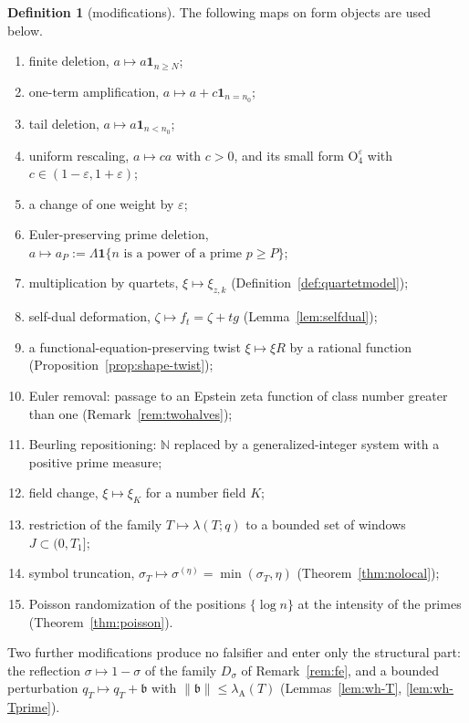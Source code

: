 \documentclass[11pt]{amsart}
\theoremstyle{definition}
\newtheorem{definition}[theorem]{Definition}
\theoremstyle{remark}
\newcommand{\N}{\mathbb N}
\newcommand{\lamA}{\lambda_{\mathrm A}(T)}
\newcommand{\sT}{\sigma_T}
\begin{document}
\begin{definition}[modifications]\label{def:shape-ops}
The following maps on form objects are used below.
\begin{enumerate}
\item[$\mathrm O_1$] finite deletion, $a\mapsto a\mathbf 1_{n\ge N}$;
\item[$\mathrm O_2$] one-term amplification, $a\mapsto a+c\mathbf 1_{n=n_0}$;
\item[$\mathrm O_3$] tail deletion, $a\mapsto a\mathbf 1_{n<n_0}$;
\item[$\mathrm O_4$] uniform rescaling, $a\mapsto ca$ with $c>0$, and its small form $\mathrm O_4^\varepsilon$ with $c\in(1-\varepsilon,1+\varepsilon)$;
\item[$\mathrm O_5$] a change of one weight by $\varepsilon$;
\item[$\mathrm O_6$] Euler-preserving prime deletion, $a\mapsto a_P:=\Lambda\mathbf 1\{n\text{ is a power of a prime }p\ge P\}$;
\item[$\mathrm O_7$] multiplication by quartets, $\xi\mapsto\xi_{z,k}$ (Definition~\ref{def:quartetmodel});
\item[$\mathrm O_8$] self-dual deformation, $\zeta\mapsto f_t=\zeta+tg$ (Lemma~\ref{lem:selfdual});
\item[$\mathrm O_9$] a functional-equation-preserving twist $\xi\mapsto\xi R$ by a rational function (Proposition~\ref{prop:shape-twist});
\item[$\mathrm O_{10}$] Euler removal: passage to an Epstein zeta function of class number greater than one (Remark~\ref{rem:twohalves});
\item[$\mathrm O_{11}$] Beurling repositioning: $\N$ replaced by a generalized-integer system with a positive prime measure;
\item[$\mathrm O_{12}$] field change, $\xi\mapsto\xi_K$ for a number field $K$;
\item[$\mathrm O_{13}$] restriction of the family $T\mapsto\lambda(T;q)$ to a bounded set of windows $J\subset(0,T_1]$;
\item[$\mathrm O_{14}$] symbol truncation, $\sT\mapsto\sigma^{(\eta)}=\min(\sT,\eta)$ (Theorem~\ref{thm:nolocal});
\item[$\mathrm O_{15}$] Poisson randomization of the positions $\{\log n\}$ at the intensity of the primes (Theorem~\ref{thm:poisson}).
\end{enumerate}
Two further modifications produce no falsifier and enter only the structural part: the reflection $\sigma\mapsto1-\sigma$ of the
family $D_\sigma$ of Remark~\ref{rem:fe}, and a bounded perturbation $q_T\mapsto q_T+\mathfrak b$ with $\|\mathfrak b\|\le\lamA$
(Lemmas~\ref{lem:wh-T}, \ref{lem:wh-Tprime}).
\end{definition}
\end{document}
